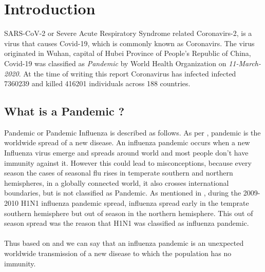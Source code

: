 \documentclass[12pt, twosided]{report}  %
\begin{document}
\printnomenclature

\pagebreak

\section{Introduction}
SARS-CoV-2 or Severe Acute Respiratory Syndrome related Coronavirs-2, is a virus that causes Covid-19, which is commonly known as Coronavirs. The virus originated in Wuhan, capital of Hubei Province of People's Republic of China, Covid-19 was classified as \textit{Pandemic} by World Health Organization on \textit{11-March-2020}. At the time of writing this report Coronavirus has infected infected 7360239 and killed 416201 individuals across 188 countries. 

\subsection*{What is a Pandemic ?}
Pandemic or Pandemic Influenza is described as follows. As per \cite{WHO_2010_1}, pandemic is the worldwide spread of a new disease. An influenza pandemic occurs when a new Influenza virus emerge and spreads around world and most people don't have immunity against it. However this could lead to misconceptions, because every season the cases of seasonal flu rises in  temperate southern and northern hemispheres, in a globally connected world, it also crosses international boundaries, but is not classified as Pandemic. As mentioned in \cite{WHO_2011}, during the 2009-2010 H1N1 influenza pandemic spread, influenza spread early in the temprate southern hemisphere but out of season in the northern hemisphere. This out of season spread was the reason that H1N1 was classified as influenza pandemic.
\\
\\
Thus based on \cite{WHO_2010_1} and \cite{WHO_2011} we can say that an influenza pandemic is an unexpected worldwide transmission of a new disease to which the population has no immunity. 
\end{document}
